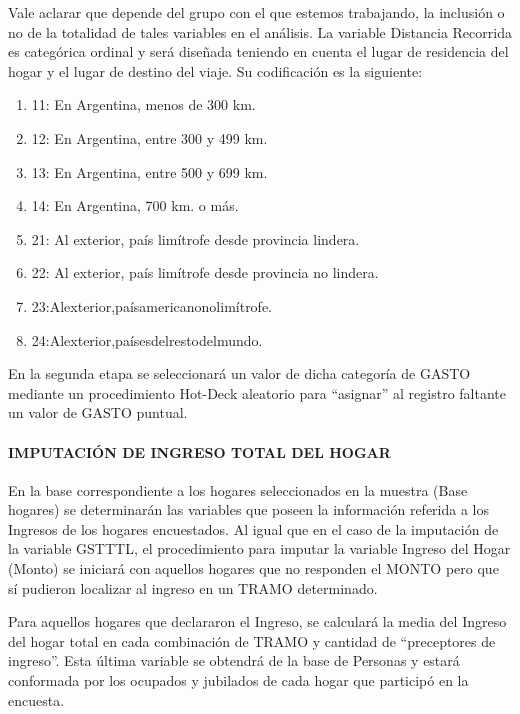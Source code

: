 \documentclass[
  openany]{book}
\begin{document}
Vale aclarar que depende del grupo con el que estemos trabajando, la inclusión o no de la totalidad de tales variables en el análisis. La variable Distancia Recorrida es categórica ordinal y será diseñada teniendo en cuenta el lugar de residencia del hogar y el lugar de destino del viaje. Su codificación es la siguiente:

\begin{enumerate}
\def\labelenumi{\arabic{enumi}.}
\item
  11: En Argentina, menos de 300 km.
\item
  12: En Argentina, entre 300 y 499 km.
\item
  13: En Argentina, entre 500 y 699 km.
\item
  14: En Argentina, 700 km. o más.
\item
  21: Al exterior, país limítrofe desde provincia lindera.
\item
  22: Al exterior, país limítrofe desde provincia no lindera.
\item
  23:Alexterior,paísamericanonolimítrofe.
\item
  24:Alexterior,paísesdelrestodelmundo.
\end{enumerate}

En la segunda etapa se seleccionará un valor de dicha categoría de GASTO mediante un procedimiento Hot-Deck aleatorio para ``asignar'' al registro faltante un valor de GASTO puntual.

\hypertarget{imputaciuxf3n-de-ingreso-total-del-hogar}{%
\paragraph{\texorpdfstring{\textbf{IMPUTACIÓN DE INGRESO TOTAL DEL HOGAR}}{IMPUTACIÓN DE INGRESO TOTAL DEL HOGAR}}\label{imputaciuxf3n-de-ingreso-total-del-hogar}}

En la base correspondiente a los hogares seleccionados en la muestra (Base hogares) se determinarán las variables que poseen la información referida a los Ingresos de los hogares encuestados. Al igual que en el caso de la imputación de la variable GSTTTL, el procedimiento para imputar la variable Ingreso del Hogar (Monto) se iniciará con aquellos hogares que no responden el MONTO pero que sí pudieron localizar al ingreso en un TRAMO determinado.

Para aquellos hogares que declararon el Ingreso, se calculará la media del Ingreso del hogar total en cada combinación de TRAMO y cantidad de ``preceptores de ingreso''. Esta última variable se obtendrá de la base de Personas y estará conformada por los ocupados y jubilados de cada hogar que participó en la encuesta.
\end{document}
